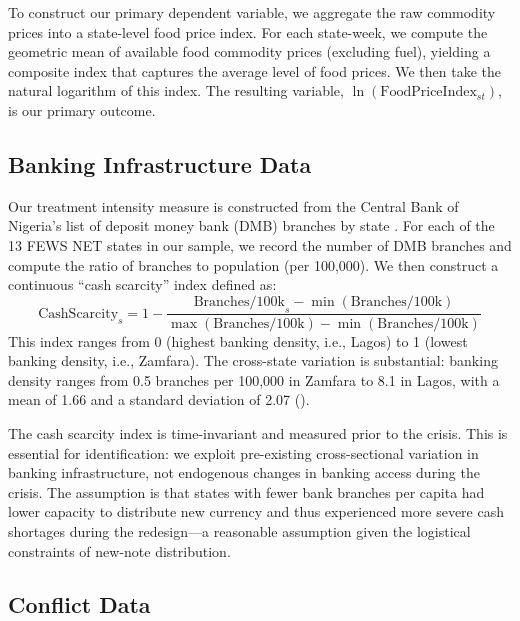 \documentclass[12pt]{article}
\begin{document}
To construct our primary dependent variable, we aggregate the raw commodity prices into a state-level food price index. For each state-week, we compute the geometric mean of available food commodity prices (excluding fuel), yielding a composite index that captures the average level of food prices. We then take the natural logarithm of this index. The resulting variable, $\ln(\text{FoodPriceIndex}_{st})$, is our primary outcome.

\subsection{Banking Infrastructure Data}

Our treatment intensity measure is constructed from the Central Bank of Nigeria's list of deposit money bank (DMB) branches by state \citep{cbn2023banking}. For each of the 13 FEWS NET states in our sample, we record the number of DMB branches and compute the ratio of branches to population (per 100,000). We then construct a continuous ``cash scarcity'' index defined as:
\begin{equation}
    \text{CashScarcity}_s = 1 - \frac{\text{Branches/100k}_s - \min(\text{Branches/100k})}{\max(\text{Branches/100k}) - \min(\text{Branches/100k})}
\end{equation}
This index ranges from 0 (highest banking density, i.e., Lagos) to 1 (lowest banking density, i.e., Zamfara). The cross-state variation is substantial: banking density ranges from 0.5 branches per 100,000 in Zamfara to 8.1 in Lagos, with a mean of 1.66 and a standard deviation of 2.07 ().

The cash scarcity index is time-invariant and measured prior to the crisis. This is essential for identification: we exploit pre-existing cross-sectional variation in banking infrastructure, not endogenous changes in banking access during the crisis. The assumption is that states with fewer bank branches per capita had lower capacity to distribute new currency and thus experienced more severe cash shortages during the redesign---a reasonable assumption given the logistical constraints of new-note distribution.

\subsection{Conflict Data}
\end{document}
